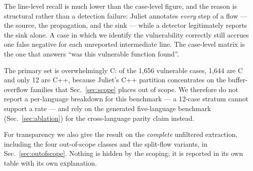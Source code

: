 \documentclass[10pt,conference]{IEEEtran}
\begin{document}
\begin{table}[t]
\centering
\caption{RQ1 primary: NIST Juliet v1.3, in-scope classes, flow variants
01--12 (6{,}976 functions). \emph{Measured by the released harness.}}
\label{tab:primary}
\end{table}

The line-level recall is much lower than the case-level figure, and the
reason is structural rather than a detection failure: Juliet annotates
\emph{every} step of a flow --- the source, the propagation, and the sink ---
while a detector legitimately reports the sink alone. A case in which we
identify the vulnerability correctly still accrues one false negative for
each unreported intermediate line. The case-level matrix is the one that
answers ``was this vulnerable function found''.

The primary set is overwhelmingly C: of the 1{,}656 vulnerable cases, 1{,}644
are C and only 12 are C++, because Juliet's C++ partition concentrates on the
buffer-overflow families that Sec.~\ref{sec:scope} places out of scope. We
therefore do not report a per-language breakdown for this benchmark --- a
12-case stratum cannot support a rate --- and rely on the generated
five-language benchmark (Sec.~\ref{sec:ablation}) for the cross-language
parity claim instead.

For transparency we also give the result on the \emph{complete} unfiltered
extraction, including the four out-of-scope classes and the split-flow
variants, in Sec.~\ref{sec:outofscope}. Nothing is hidden by the scoping; it
is reported in its own table with its own explanation.
\end{document}
